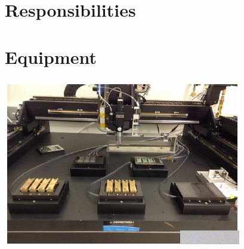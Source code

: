 \documentclass[12pt]{unlsilabsop}
\begin{document}
\section{Responsibilities}

\section{Equipment}
\begin{center}
\includegraphics{glueing_setup}
\end{center}
\end{document}
